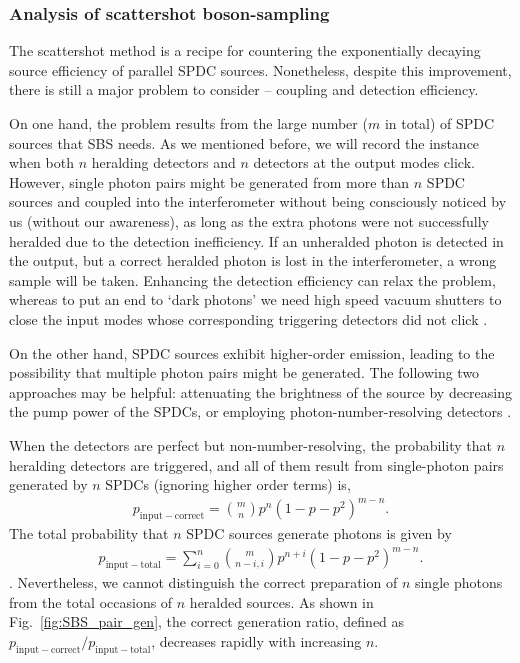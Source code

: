 \documentclass[aps,rmp,twocolumn,amsmath,amssymb,nofootinbib,superscriptaddress]{revtex4}
\newcommand{\comment}[1]{{\color{blue}{#1}}}
\begin{document}
\subsubsection{Analysis of scattershot boson-sampling}

The scattershot method is a recipe for countering the exponentially decaying source efficiency of parallel SPDC sources. Nonetheless, despite this improvement, there is still a major problem to consider -- coupling and detection efficiency.

On one hand, the problem results from the large number ($m$ in total) of SPDC sources that SBS needs. As we mentioned before, we will record the instance when both $n$ heralding detectors and $n$ detectors at the output modes click. However, single photon pairs might be generated from more than $n$ SPDC sources and coupled into the interferometer without being consciously noticed by us (without our awareness), as long as the extra photons were not successfully heralded due to the detection inefficiency. If an unheralded photon is detected in the output, but a correct heralded photon is lost in the interferometer, a wrong sample will be taken. Enhancing the detection efficiency can relax the problem, whereas to put an end to `dark photons' we need high speed vacuum shutters to close the input modes whose corresponding triggering detectors did not click \cite{bib:38}. 

On the other hand, SPDC sources exhibit higher-order emission, leading to the possibility that multiple photon pairs might be generated. The following two approaches may be helpful: attenuating the brightness of the source by decreasing the pump power of the SPDCs, or employing photon-number-resolving detectors \cite{bib:34}.

When the detectors are perfect but non-number-resolving, the probability that $n$ heralding detectors are triggered, and all of them result from single-photon pairs generated by $n$ SPDCs (ignoring higher order terms) is,
\begin{align}
p_\mathrm{input-correct} = \binom{m}{n} p^n(1-p-p^2)^{m-n}.
\end{align}
The total probability that $n$ SPDC sources generate photons is given by
\begin{align}
p_\mathrm{input-total} = \sum_{i=0}^n \binom{m}{n-i,i}p^{n+i}(1-p-p^2)^{m-n}.
\end{align}
\comment{What's the funny binomial?}. Nevertheless, we cannot distinguish the correct preparation of $n$ single photons from the total occasions of $n$ heralded sources. As shown in Fig.~\ref{fig:SBS_pair_gen}, the correct generation ratio, defined as $p_\mathrm{input-correct}/p_\mathrm{input-total}$, decreases rapidly with increasing $n$.
\end{document}
